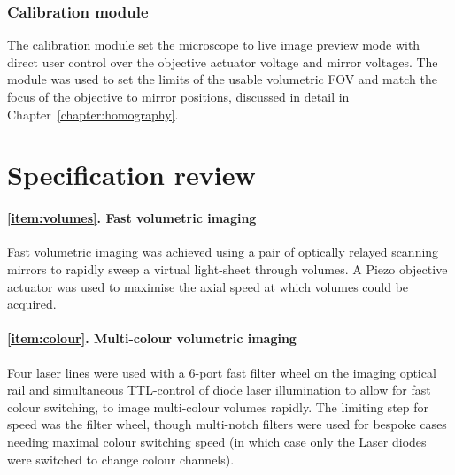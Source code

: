 %
%

\subsubsection{Calibration module}

The calibration module set the microscope to live image preview mode with direct user control over the objective actuator voltage and mirror voltages.
The module was used to set the limits of the usable volumetric FOV and match the focus of the objective to mirror positions, discussed in detail in Chapter~\ref{chapter:homography}.

\section{Specification review}

\paragraph{\ref{item:volumes}. Fast volumetric imaging}
Fast volumetric imaging was achieved using a pair of optically relayed scanning mirrors to rapidly sweep a virtual light-sheet through volumes.
A Piezo objective actuator was used to maximise the axial speed at which volumes could be acquired.

\paragraph{\ref{item:colour}. Multi-colour volumetric imaging}
Four laser lines were used with a 6-port fast filter wheel on the \gls{imaging optical rail} and
simultaneous \gls{TTL}-control of diode laser illumination
to allow for fast colour switching, to image multi-colour volumes rapidly.
The limiting step for speed was the filter wheel, though multi-notch filters were used for bespoke cases needing maximal colour switching speed (in which case only the \gls{Laser} diodes were switched to change colour channels).%

